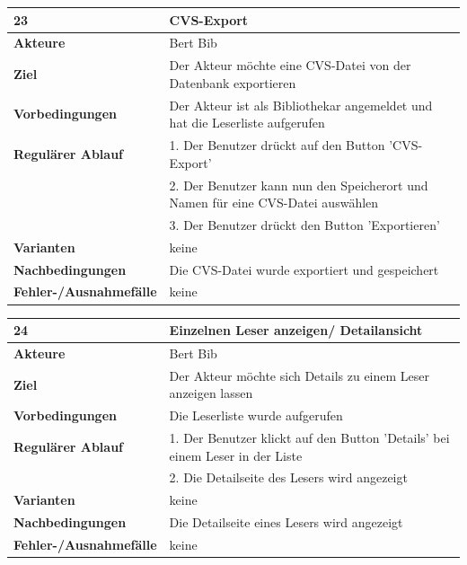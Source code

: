 \documentclass[fontsize=12pt,paper=a4,twoside]{scrartcl}
\begin{document}
\begin{table}[htbp]
\label{23}
\begin{tabular}{|l|p{10cm}|}
\hline 
\textbf{23} & \textbf{CVS-Export} \\ \hline
\textbf{Akteure} & Bert Bib\\ \hline
\textbf{Ziel} & Der Akteur möchte eine CVS-Datei von der Datenbank exportieren \\ \hline
\textbf{Vorbedingungen} & Der Akteur ist als Bibliothekar angemeldet und hat die Leserliste aufgerufen \\ \hline
\textbf{Regulärer Ablauf} & 
1. Der Benutzer drückt auf den Button 'CVS-Export' \\
&2. Der Benutzer kann nun den Speicherort und Namen für eine CVS-Datei auswählen\\
&3. Der Benutzer drückt den Button 'Exportieren'\\
\hline
\textbf{Varianten} & 
keine \\ \hline
\textbf{Nachbedingungen} & Die CVS-Datei wurde exportiert und gespeichert\\ \hline
\textbf{Fehler-/Ausnahmefälle} & keine\\
\hline
\end{tabular}
\end{table}

\begin{table}[htbp]
\label{24}
\begin{tabular}{|l|p{10cm}|}
\hline 
\textbf{24} & \textbf{Einzelnen Leser anzeigen/ Detailansicht} \\ \hline
\textbf{Akteure} & Bert Bib\\ \hline
\textbf{Ziel} & Der Akteur möchte sich Details zu einem Leser anzeigen lassen \\ \hline
\textbf{Vorbedingungen} & Die Leserliste wurde aufgerufen \\ \hline
\textbf{Regulärer Ablauf} & 
1. Der Benutzer klickt auf den Button 'Details' bei einem Leser in der Liste \\
&2. Die Detailseite des Lesers wird angezeigt\\
\hline
\textbf{Varianten} & 
keine \\ \hline
\textbf{Nachbedingungen} & Die Detailseite eines Lesers wird angezeigt\\ \hline
\textbf{Fehler-/Ausnahmefälle} & keine\\
\hline
\end{tabular}
\end{table}
\end{document}
